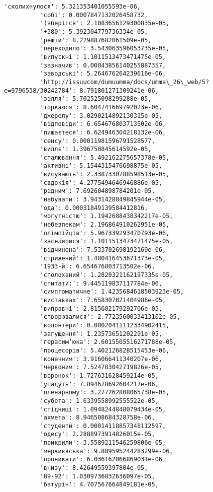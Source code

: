 \documentclass[11pt]{article}
\begin{document}
\begin{Verbatim}[commandchars=\\\{\}]
          'сколихнулося': 5.321353401055593e-06,
          'собі': 0.0007847132026458732,
          '(зберігся': 2.1083656129300835e-05,
          '+380': 5.392304779736334e-05,
          'решти': 8.229887682061509e-05,
          'переходило': 3.543063596053735e-05,
          'випускні': 1.1011513473471475e-05,
          'зазначив': 0.00043856140255887357,
          'заводські': 5.264676264239616e-06,
          'http://issuucom/dumuumma/docs/umma\_26\_web/5?e=9796538/30242784': 8.791801271309241e-06,
          'зілля': 5.702525098299288e-05,
          'торкаюся': 8.604741669792023e-06,
          'джерелу': 3.0290214892130315e-05,
          'відповіди': 6.654676803713502e-06,
          'пишаєтеся': 6.624946304218132e-06,
          'сенсу': 0.00011981596791528577,
          'виллє': 1.396750845614592e-05,
          'спалювання': 5.492162275657378e-05,
          'активні': 5.1544315476698875e-05,
          'висувають': 2.3387330788598513e-05,
          'євдокія': 4.2775494646946886e-05,
          'рідним': 7.692604898784201e-05,
          'набувати': 3.9431428849845944e-05,
          'ода': 0.00031849139584412816,
          'могутністю': 1.1942688438342217e-05,
          'небезпекам': 2.196864910262951e-05,
          'олімпійців': 5.967339293470793e-06,
          'заселилися': 1.1011513473471475e-05,
          'відчинена': 7.533702698192169e-06,
          'стрижений': 1.480416453671373e-05,
          '1933-й': 6.654676803713502e-06,
          'сполоханий': 1.2820321162197335e-05,
          'спитати:': 9.445119837117784e-06,
          'симптоматичне': 1.4235684618503923e-05,
          'виставках': 7.658307021404986e-05,
          'виправні': 2.815602179292706e-05,
          'створювалися': 2.7723560033413102e-05,
          'волонтери': 0.00020411112334902415,
          'загущення': 1.23573651202291e-05,
          'герасим’юка': 2.6015505516271788e-05,
          'процесорів': 5.402126828515453e-06,
          'конечним': 3.916066411340207e-06,
          'червоним': 7.524783042719826e-05,
          'воронок': 1.727631628459214e-05,
          'упадуть': 7.894678692604217e-06,
          'пленарному': 3.277262808065738e-05,
          'субота': 1.6339558992555522e-05,
          'спідниці': 1.0948244848079434e-05,
          'ахмета': 8.946508684328758e-06,
          'студенти': 0.00014118857348112597,
          'одесу': 2.2888973914826015e-05,
          'прикрили': 3.5589211546259806e-05,
          'мержиєвська': 9.809595244283299e-06,
          'проникати': 6.036162066869031e-06,
          'внизу': 8.42649559397804e-05,
          '89-92': 1.0309736832636097e-05,
          'батурін': 4.707567664849181e-05,

\end{Verbatim}
\end{document}
